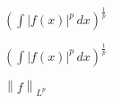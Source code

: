 \documentclass{article}
\begin{document}
    $\left(\int \left|{f{\left(x \right)}}\right|^{p}\, dx\right)^{\frac{1}{p}}$

    $\left(\int \left|{f{\left(x \right)}}\right|^{p}\, dx\right)^{\frac{1}{p}}$
    
    $\left \| f \right \|_{L^{p}}$
\end{document}
